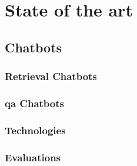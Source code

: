 \chapter{State of the art}
\label{chap:state-of-the-art}

\section{Chatbots}
\subsection{Retrieval Chatbots}
\subsection{\gls{qa} Chatbots}
\subsection{Technologies}
\subsection{Evaluations}